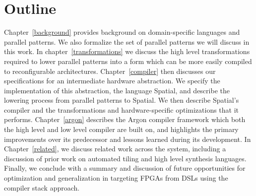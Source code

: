\section{Outline}
Chapter~\ref{background} provides background on domain-specific languages and parallel patterns.
We also formalize the set of parallel patterns we will discuss in this work.
In chapter~\ref{transformations} we discuss the high level transformations required to lower
parallel patterns into a form which can be more easily compiled to reconfigurable architectures.
Chapter~\ref{compiler} then discusses our specifications for an intermediate hardware abstraction.
We specify the implementation of this abstraction, the language Spatial, and describe the lowering
process from parallel patterns to Spatial.
We then describe Spatial's compiler and the transformations and hardware-specific optimizations that it performs.
Chapter~\ref{argon} describes the Argon compiler framework which both the high level and low level compiler are
built on, and highlights the primary improvements over its predecessor and lessons learned during its development.
In Chapter~\ref{related}, we discuss related work across the system, including a discussion of
prior work on automated tiling and high level synthesis languages.
Finally, we conclude with a summary and discussion of future opportunities for optimization
and generalization in targeting FPGAs from DSLs using the compiler stack approach.
